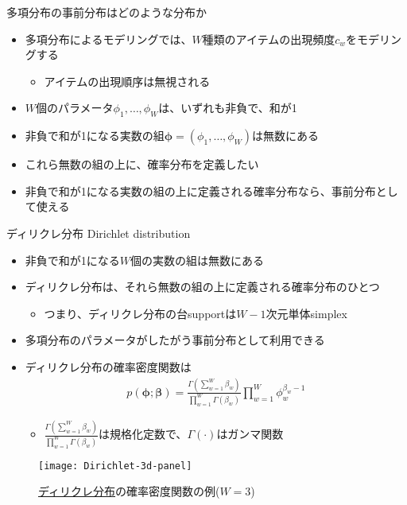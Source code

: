 \documentclass[aspectratio=169,unicode,dvipdfmx,14pt]{beamer}
\begin{document}
\begin{frame}{多項分布の事前分布はどのような分布か}
\begin{itemize}
\item 多項分布によるモデリングでは、$W$種類のアイテムの出現頻度$c_w$をモデリングする
\begin{itemize}
\item アイテムの出現順序は無視される
\end{itemize}
\item $W$個のパラメータ$\phi_1,\ldots,\phi_W$は、いずれも非負で、和が1
\item 非負で和が1になる実数の組$\bm{\phi}=(\phi_1,\ldots,\phi_W)$は無数にある
\item これら無数の組の上に、確率分布を定義したい
\item 非負で和が1になる実数の組の上に定義される確率分布なら、事前分布として使える
\end{itemize}
\end{frame}

\begin{frame}{ディリクレ分布 Dirichlet distribution}
\begin{itemize}
\item 非負で和が1になる$W$個の実数の組は無数にある
\item ディリクレ分布は、それら無数の組の上に定義される確率分布のひとつ
\begin{itemize}
\item つまり、ディリクレ分布の台supportは$W-1$次元単体simplex
\end{itemize}
\item 多項分布のパラメータがしたがう事前分布として利用できる
\item ディリクレ分布の確率密度関数は
\begin{align}
p(\bm{\phi};\bm{\beta})=\frac{\Gamma(\sum_{w=1}^W \beta_w)}{\prod_{w=1}^W\Gamma(\beta_w)}
\prod_{w=1}^W \phi_w^{\beta_w - 1}
\end{align}
\begin{itemize}
\item $\frac{\Gamma(\sum_{w=1}^W \beta_w)}{\prod_{w=1}^W\Gamma(\beta_w)}$は規格化定数で、$\Gamma(\cdot)$はガンマ関数
\end{itemize}
\end{itemize}
\end{frame}

\begin{frame}
\begin{figure}[htbp]
\begin{center}
\texttt{[image: Dirichlet-3d-panel]}
\caption{\href{https://en.wikipedia.org/wiki/Dirichlet_distribution}{ディリクレ分布}の確率密度関数の例($W=3$)}
\label{}
\end{center}
\end{figure}
\end{frame}
\end{document}
